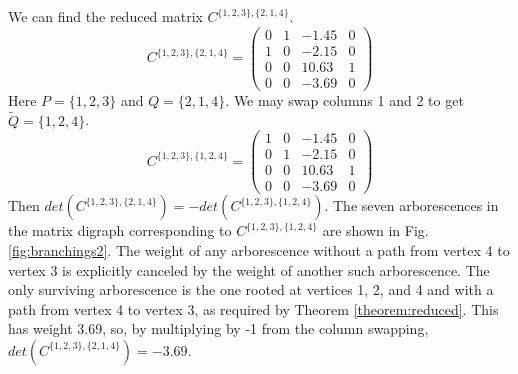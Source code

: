 \documentclass{article}
\begin{document}
We can find the reduced matrix $C^{\{1,2,3\},\{2,1,4\}}$.
\begin{equation}
    C^{\{1,2,3\},\{2,1,4\}} = \begin{pmatrix}
0 & 1 & -1.45 & 0\\
1 & 0 & -2.15 & 0\\
0 & 0 & 10.63 & 1\\
0 & 0 & -3.69 & 0
\end{pmatrix}
\label{eq:M_cof}
\end{equation}
Here $P = \{1,2,3\}$ and $Q = \{2,1,4\}$.  We may swap columns 1 and 2 to get ${\tilde Q} = \{1,2,4\}$.  
\begin{equation}
    C^{\{1,2,3\},\{1,2,4\}} = \begin{pmatrix}
1 & 0 & -1.45 & 0\\
0 & 1 & -2.15 & 0\\
0 & 0 & 10.63 & 1\\
0 & 0 & -3.69 & 0
\end{pmatrix}
\label{eq:M_cof2}
\end{equation}
Then $det(C^{\{1,2,3\}, \{2,1,4\}}) = -det(C^{\{1,2,3\},\{1,2,4\}})$.  The seven arborescences in the matrix digraph corresponding to $C^{\{1,2,3\},\{1,2,4\}}$ are shown in Fig. \ref{fig:branchings2}.  The weight of any arborescence without a path from vertex 4 to vertex 3 is explicitly canceled by the weight of another such arborescence.  The only surviving arborescence is the one rooted at vertices 1, 2, and 4 and with a path from vertex 4 to vertex 3, as required by Theorem \ref{theorem:reduced}.  This has weight 3.69, so, by multiplying by -1 from the column swapping, $det(C^{\{1,2,3\},\{2,1,4\}}) = -3.69$.
\end{document}
